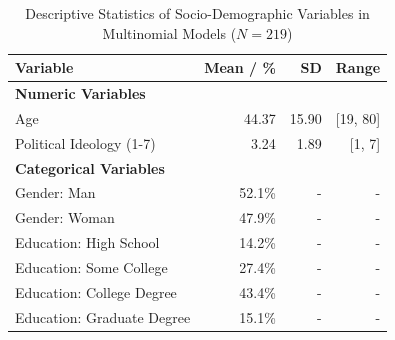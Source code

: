 \begin{table}[htpb]
\centering
\begin{tabular}{lrrr}
\toprule
Variable & Mean / \% & SD & Range \\
\midrule
\textbf{Numeric Variables} & & & \\
Age & 44.37 & 15.90 & [19, 80] \\
Political Ideology (1-7) & 3.24 & 1.89 & [1, 7] \\
\midrule
\textbf{Categorical Variables} & & & \\
Gender: Man & 52.1\% & - & - \\
Gender: Woman & 47.9\% & - & - \\
Education: High School & 14.2\% & - & - \\
Education: Some College & 27.4\% & - & - \\
Education: College Degree & 43.4\% & - & - \\
Education: Graduate Degree & 15.1\% & - & - \\
\bottomrule
\end{tabular}
\caption{Descriptive Statistics of Socio-Demographic Variables in Multinomial Models ($N = 219$)}
\label{tab:descriptives}
\end{table}

